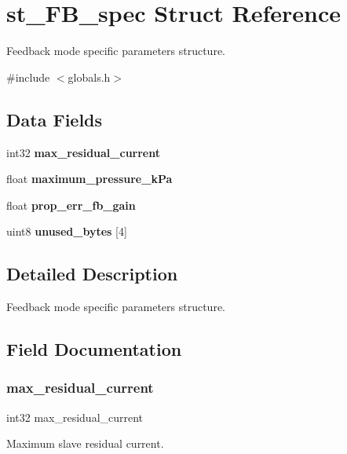 \section{st\+\_\+\+F\+B\+\_\+spec Struct Reference}
\label{structst___f_b__spec}


Feedback mode specific parameters structure.  




{\ttfamily \#include $<$globals.\+h$>$}

\subsection*{Data Fields}
\begin{DoxyCompactItemize}
\item 
int32 \textbf{ max\+\_\+residual\+\_\+current}
\item 
float \textbf{ maximum\+\_\+pressure\+\_\+k\+Pa}
\item 
float \textbf{ prop\+\_\+err\+\_\+fb\+\_\+gain}
\item 
uint8 \textbf{ unused\+\_\+bytes} [4]
\end{DoxyCompactItemize}


\subsection{Detailed Description}
Feedback mode specific parameters structure. 



\subsection{Field Documentation}
\mbox{\label{structst___f_b__spec_ae45cd3ea0d259d336d19134d8b0929e2}} 
\subsubsection{max\+\_\+residual\+\_\+current}
{\footnotesize\ttfamily int32 max\+\_\+residual\+\_\+current}

Maximum slave residual current. \mbox{\label{structst___f_b__spec_a2a662a7d7984ee0f4ed5054ca7e782da}} 
